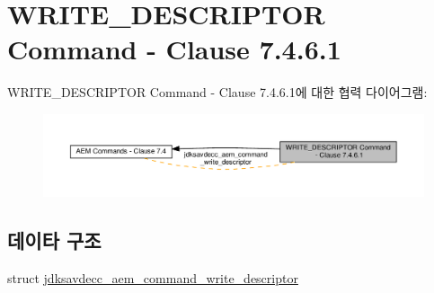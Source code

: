 \hypertarget{group__command__write__descriptor}{}\section{W\+R\+I\+T\+E\+\_\+\+D\+E\+S\+C\+R\+I\+P\+T\+OR Command -\/ Clause 7.4.6.1}
\label{group__command__write__descriptor}
W\+R\+I\+T\+E\+\_\+\+D\+E\+S\+C\+R\+I\+P\+T\+OR Command -\/ Clause 7.4.6.1에 대한 협력 다이어그램\+:
\nopagebreak
\begin{figure}[H]
\begin{center}
\leavevmode
\includegraphics[width=350pt]{group__command__write__descriptor}
\end{center}
\end{figure}
\subsection*{데이타 구조}
\begin{DoxyCompactItemize}
\item 
struct \hyperlink{structjdksavdecc__aem__command__write__descriptor}{jdksavdecc\+\_\+aem\+\_\+command\+\_\+write\+\_\+descriptor}
\end{DoxyCompactItemize}

